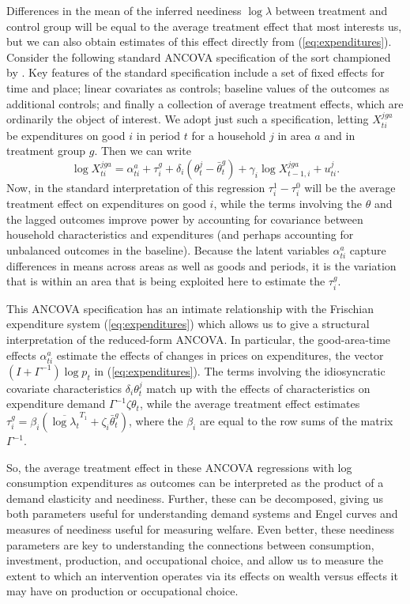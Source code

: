 \documentclass[11pt]{article}
\newcommand{\Eq}[1]{(\ref{eq:#1})}
\begin{document}
Differences in the mean of the inferred neediness $\log\lambda$ between
treatment and control group will be equal to the average treatment
effect that most interests us, but we can also obtain estimates of
this effect directly from \Eq{expenditures}.  Consider the following
standard ANCOVA specification of the sort championed by
\cite{Mckenzie2012}.  Key features of the standard specification
include a set of fixed effects for time and place; linear covariates
as controls; baseline values of the outcomes as additional controls;
and finally a collection of average treatment effects, which are
ordinarily the object of interest.  We adopt just such a
specification, letting $X^{jga}_{ti}$ be expenditures on good $i$ in
period $t$ for a household \(j\) in area $a$ and in treatment group $g$.
Then we can write
\begin{equation}
\label{eq:ancova}
  \log X^{jga}_{ti} = \alpha^a_{ti} + \tau^g_i +  \delta_i(\theta^j_t - \bar\theta^g_t) + \gamma_i \log X^{jga}_{t-1,i} + u^j_{ti}.
\end{equation}
Now, in the standard interpretation of this regression $\tau^1_i-\tau^0_i$
will be the average treatment effect on expenditures on good $i$, while the terms
involving the $\theta$ and the lagged outcomes improve power by
accounting for covariance between household characteristics and
expenditures (and perhaps accounting for unbalanced outcomes in the
baseline).  Because the latent variables $\alpha^a_{ti}$ capture
differences in means across areas as well as goods and periods, it is
the variation that is within an area that is being exploited here to
estimate the $\tau^g_i$.

This ANCOVA specification has an intimate relationship with the
Frischian expenditure system \Eq{expenditures} which allows us to give
a structural interpretation of the reduced-form ANCOVA.  In
particular, the good-area-time effects $\alpha^a_{ti}$ estimate the
effects of changes in prices on expenditures, the vector
$(I + \Gamma^{-1})\log p_{t}$ in \Eq{expenditures}.  The terms involving
the idiosyncratic covariate characteristics $\delta_i\theta^j_t$ match
up with the effects of characteristics on expenditure demand
$\Gamma^{-1}\zeta\theta_t$, while the average treatment effect
estimates $\tau^g_i=\beta_i(\overline{\log\lambda_t}^{T_1} +
\zeta_i\bar\theta^g_t)$, where the $\beta_i$
are equal to the row sums of the matrix $\Gamma^{-1}$. 

So, the average treatment effect in these ANCOVA regressions with log
consumption expenditures as outcomes can be interpreted as the product
of a demand elasticity and neediness.  Further, these can be
decomposed, giving us both parameters useful for understanding demand
systems and Engel curves and measures of neediness useful for
measuring welfare.  Even better, these neediness parameters are key to
understanding the connections between consumption, investment,
production, and occupational choice, and allow us to measure
the extent to which an intervention operates via its effects on wealth
versus effects it may have on production or occupational choice.
\end{document}
